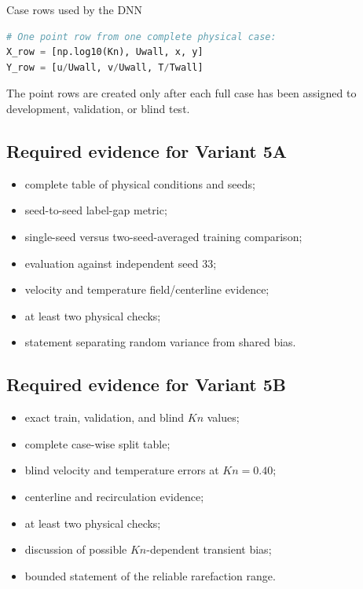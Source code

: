 \documentclass[11pt]{article}
\begin{document}
\begin{codeguide}{Case rows used by the DNN}
\begin{lstlisting}[language=Python]
# One point row from one complete physical case:
X_row = [np.log10(Kn), Uwall, x, y]
Y_row = [u/Uwall, v/Uwall, T/Twall]
\end{lstlisting}
The point rows are created only after each full case has been assigned to development, validation, or blind test.
\end{codeguide}

\subsection{Required evidence for Variant 5A}
\begin{itemize}
\item complete table of physical conditions and seeds;
\item seed-to-seed label-gap metric;
\item single-seed versus two-seed-averaged training comparison;
\item evaluation against independent seed 33;
\item velocity and temperature field/centerline evidence;
\item at least two physical checks;
\item statement separating random variance from shared bias.
\end{itemize}

\subsection{Required evidence for Variant 5B}
\begin{itemize}
\item exact train, validation, and blind $Kn$ values;
\item complete case-wise split table;
\item blind velocity and temperature errors at $Kn=0.40$;
\item centerline and recirculation evidence;
\item at least two physical checks;
\item discussion of possible $Kn$-dependent transient bias;
\item bounded statement of the reliable rarefaction range.
\end{itemize}
\end{document}
